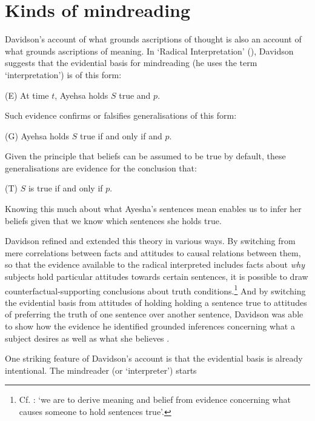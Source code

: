 \documentclass[12pt,a4paper]{extarticle}
\begin{document}
\section{Kinds of mindreading}
Davidson's account of what grounds ascriptions of thought is also an account of what grounds ascriptions of meaning.
In `Radical Interpretation'
(\citeyear{Davidson:1973jx}), Davidson suggests that the evidential basis for mindreading 
(he uses the term `interpretation')
is of this form:
%
\begin{idescription}
\item[(E)] At time $t$, Ayehsa holds $S$ true and $p$.
\end{idescription}
%
Such evidence confirms or falsifies generalisations of this form:
%
\begin{idescription}
\item[(G)] Ayehsa holds $S$ true if and only if and $p$.
\end{idescription}
%
Given the principle that beliefs can be assumed to be true by default, these generalisations are evidence for the conclusion that:
%
\begin{idescription}
\item[(T)] $S$ is true if and only if $p$.
\end{idescription}
%
Knowing this much about what Ayesha's sentences mean enables us to infer her beliefs given that we know which sentences she holds true.

Davidson refined and extended this theory in various ways.
By switching from mere correlations between facts and attitudes to causal relations between them, so that the evidence available to the radical interpreted includes facts about \emph{why} subjects hold particular attitudes towards certain sentences, 
it is possible to draw counterfactual-supporting conclusions about truth conditions.\footnote{
Cf. \citealp[p.\ 6]{Davidson:1980xp}: `we are to derive meaning and belief from evidence concerning what causes someone to hold sentences true'.
}
%
And by switching the evidential basis from attitudes of holding holding a sentence true to attitudes of preferring the truth of one sentence over another sentence,
Davidson was able to show how the evidence he identified 
grounded inferences concerning what a subject desires as well as what she believes
\citep{Davidson:1980xp}.

One striking feature of Davidson's account is that the evidential basis is already intentional.
The mindreader (or `interpreter') starts 
\end{document}
